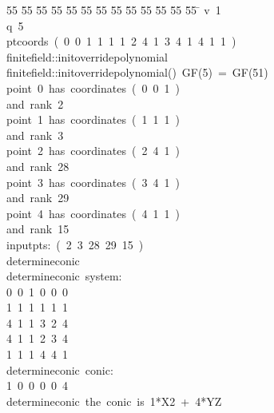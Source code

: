 %
%
\begin{tabbing}
55 \= 55 \= 55 \= 55 \= 55 \= 55 \= 55 \= 55 \= 55 \= 55 \= 55 \= 55 \= 55 \= \kill
{}v\ 1\\[0pt]
q\ 5\\[0pt]
ptcoords\ (\ 0\ 0\ 1\ 1\ 1\ 1\ 2\ 4\ 1\ 3\ 4\ 1\ 4\ 1\ 1\ )\\[0pt]
finitefield::initoverridepolynomial\\[0pt]
finitefield::initoverridepolynomial()\ GF(5)\ =\ GF(51)\\[0pt]
point\ 0\ has\ coordinates\ (\ 0\ 0\ 1\ )\\[0pt]
and\ rank\ 2\\[0pt]
point\ 1\ has\ coordinates\ (\ 1\ 1\ 1\ )\\[0pt]
and\ rank\ 3\\[0pt]
point\ 2\ has\ coordinates\ (\ 2\ 4\ 1\ )\\[0pt]
and\ rank\ 28\\[0pt]
point\ 3\ has\ coordinates\ (\ 3\ 4\ 1\ )\\[0pt]
and\ rank\ 29\\[0pt]
point\ 4\ has\ coordinates\ (\ 4\ 1\ 1\ )\\[0pt]
and\ rank\ 15\\[0pt]
inputpts:\ (\ 2\ 3\ 28\ 29\ 15\ )\\[0pt]
determineconic\\[0pt]
determineconic\ system:\\[0pt]
0\ 0\ 1\ 0\ 0\ 0\ \\[0pt]
1\ 1\ 1\ 1\ 1\ 1\ \\[0pt]
4\ 1\ 1\ 3\ 2\ 4\ \\[0pt]
4\ 1\ 1\ 2\ 3\ 4\ \\[0pt]
1\ 1\ 1\ 4\ 4\ 1\ \\[0pt]
determineconic\ conic:\\[0pt]
1\ 0\ 0\ 0\ 0\ 4\ \\[0pt]
determineconic\ the\ conic\ is\ 1*X2\ +\ 4*YZ\\[0pt]
\end{tabbing}
